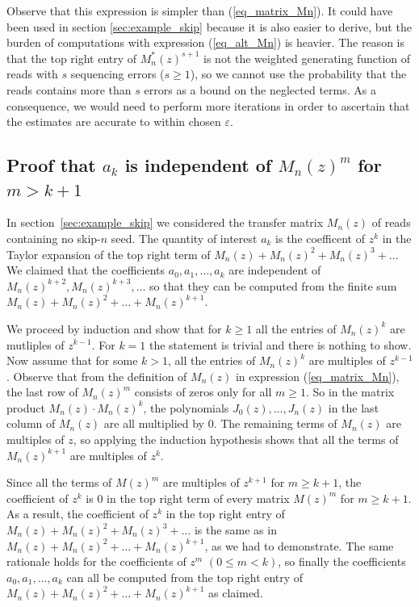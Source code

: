 \documentclass{article}
\begin{document}
Observe that this expression is simpler than (\ref{eq_matrix_Mn}). It
could have been used in section \ref{sec:example_skip} because it is also
easier to derive, but the burden of computations with expression
(\ref{eq_alt_Mn}) is heavier. The reason is that the top right entry of
$M^*_n(z)^{s+1}$ is not the weighted generating function of reads with $s$
sequencing errors ($s \geq 1$), so we cannot use the probability that the
reads contains more than $s$ errors as a bound on the neglected terms. As
a consequence, we would need to perform more iterations in order to
ascertain that the estimates are accurate to within chosen $\varepsilon$.

\subsection{Proof that $a_k$ is independent of $M_n(z)^m$ for $m > k+1$}
\label{app_skip}

In section~\ref{sec:example_skip} we considered the transfer matrix
$M_n(z)$ of reads containing no skip-$n$ seed. The quantity of interest
$a_k$ is the coefficent of $z^k$ in the Taylor expansion of the top right
term of $M_n(z) + M_n(z)^2 + M_n(z)^3 + \ldots$ We claimed that the
coefficients $a_0, a_1, \ldots, a_k$ are independent of $M_n(z)^{k+2},
M_n(z)^{k+3}, \ldots$ so that they can be computed from the finite sum
$M_n(z) + M_n(z)^2 + \ldots + M_n(z)^{k+1}$.

We proceed by induction and show that for $k \geq 1$ all the entries of
$M_n(z)^k$ are mutliples of $z^{k-1}$. For $k = 1$ the statement is
trivial and there is nothing to show. Now assume that for some $k > 1$,
all the entries of $M_n(z)^k$ are multiples of $z^{k-1}$. Observe that
from the definition of $M_n(z)$ in expression (\ref{eq_matrix_Mn}), the
last row of $M_n(z)^m$ consists of zeros only for all $m \geq 1$. So in
the matrix product $M_n(z) \cdot M_n(z)^k$, the polynomials $J_0(z),
\ldots, J_n(z)$ in the last column of $M_n(z)$ are all multiplied by 0.
The remaining terms of $M_n(z)$ are multiples of $z$, so applying the
induction hypothesis shows that all the terms of $M_n(z)^{k+1}$ are
multiples of $z^k$.

Since all the terms of $M(z)^m$ are multiples of $z^{k+1}$ for $m \geq
k+1$, the coefficient of $z^k$ is 0 in the top right term of every matrix
$M(z)^m$ for $m \geq k+1$. As a result, the coefficient of $z^k$ in the
top right entry of $M_n(z) + M_n(z)^2 + M_n(z)^3 + \ldots$ is the same as
in $M_n(z) + M_n(z)^2 + \ldots + M_n(z)^{k+1}$, as we had to demonstrate.
The same rationale holds for the coefficients of $z^m$ $(0 \leq m < k)$,
so finally the coefficients $a_0, a_1, \ldots, a_k$ can all be computed
from the top right entry of $M_n(z) + M_n(z)^2 + \ldots + M_n(z)^{k+1}$ as
claimed.
\end{document}
